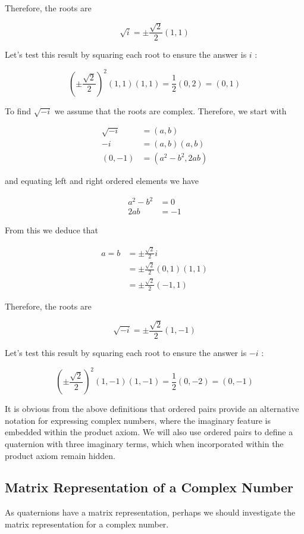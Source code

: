 \documentclass[10pt]{article}
\begin{document}
Therefore, the roots are

$$
\sqrt{i}= \pm \frac{\sqrt{2}}{2}(1,1)
$$

Let's test this result by squaring each root to ensure the answer is $i$ :

$$
\left( \pm \frac{\sqrt{2}}{2}\right)^{2}(1,1)(1,1)=\frac{1}{2}(0,2)=(0,1)
$$

To find $\sqrt{-i}$ we assume that the roots are complex. Therefore, we start with

$$
\begin{aligned}
\sqrt{-i} & =(a, b) \\
-i & =(a, b)(a, b) \\
(0,-1) & =\left(a^{2}-b^{2}, 2 a b\right)
\end{aligned}
$$

and equating left and right ordered elements we have

$$
\begin{aligned}
a^{2}-b^{2} & =0 \\
2 a b & =-1
\end{aligned}
$$

From this we deduce that

$$
\begin{aligned}
a=b & = \pm \frac{\sqrt{2}}{2} i \\
& = \pm \frac{\sqrt{2}}{2}(0,1)(1,1) \\
& = \pm \frac{\sqrt{2}}{2}(-1,1)
\end{aligned}
$$

Therefore, the roots are

$$
\sqrt{-i}= \pm \frac{\sqrt{2}}{2}(1,-1)
$$

Let's test this result by squaring each root to ensure the answer is $-i$ :

$$
\left( \pm \frac{\sqrt{2}}{2}\right)^{2}(1,-1)(1,-1)=\frac{1}{2}(0,-2)=(0,-1)
$$

It is obvious from the above definitions that ordered pairs provide an alternative notation for expressing complex numbers, where the imaginary feature is embedded within the product axiom. We will also use ordered pairs to define a quaternion with three imaginary terms, which when incorporated within the product axiom remain hidden.

\subsection{Matrix Representation of a Complex Number}
As quaternions have a matrix representation, perhaps we should investigate the matrix representation for a complex number.
\end{document}
